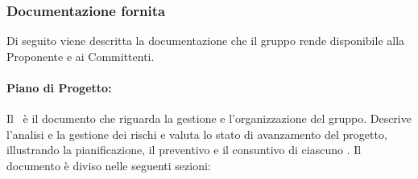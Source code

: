 \subsubsection{Documentazione fornita}\label{documentazionefornita}
Di seguito viene descritta la documentazione che il gruppo rende disponibile alla Proponente e ai Committenti.

\paragraph{Piano di Progetto:}
Il \PdP\ è il documento che riguarda la gestione e l'organizzazione del gruppo. Descrive l'analisi e la gestione dei rischi e valuta lo stato di avanzamento del progetto, illustrando la pianificazione, il preventivo e il consuntivo di ciascuno .
Il documento è diviso nelle seguenti sezioni:
